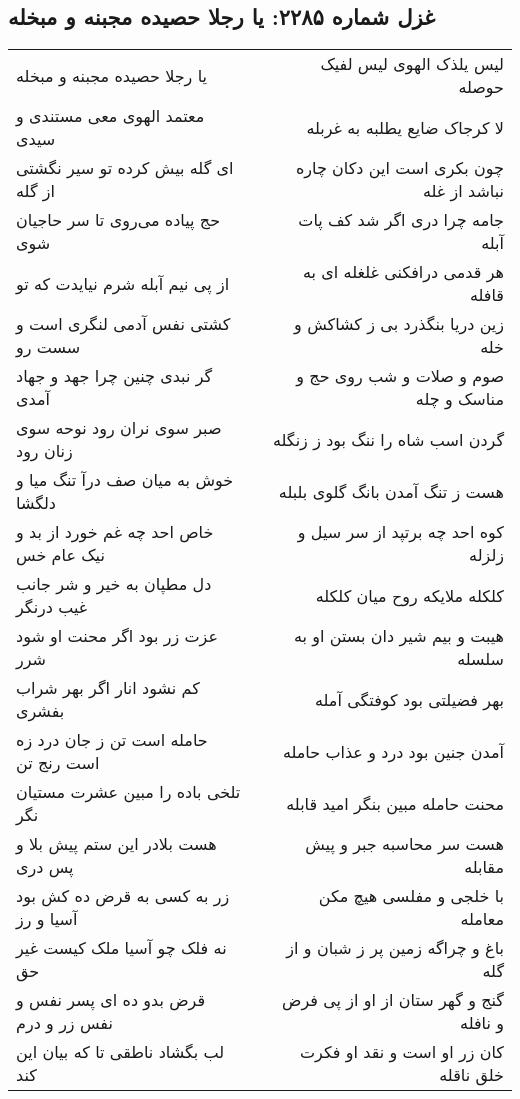\begin{center}
\section*{غزل شماره ۲۲۸۵: یا رجلا حصیده مجبنه و مبخله}
\label{sec:2285}
\begin{longtable}{l p{0.5cm} r}
یا رجلا حصیده مجبنه و مبخله
&&
لیس یلذک الهوی لیس لفیک حوصله
\\
معتمد الهوی معی مستندی و سیدی
&&
لا کرجاک ضایع یطلبه به غربله
\\
ای گله بیش کرده تو سیر نگشتی از گله
&&
چون بکری است این دکان چاره نباشد از غله
\\
حج پیاده می‌روی تا سر حاجیان شوی
&&
جامه چرا دری اگر شد کف پات آبله
\\
از پی نیم آبله شرم نیایدت که تو
&&
هر قدمی درافکنی غلغله ای به قافله
\\
کشتی نفس آدمی لنگری است و سست رو
&&
زین دریا بنگذرد بی ز کشاکش و خله
\\
گر نبدی چنین چرا جهد و جهاد آمدی
&&
صوم و صلات و شب روی حج و مناسک و چله
\\
صبر سوی نران رود نوحه سوی زنان رود
&&
گردن اسب شاه را ننگ بود ز زنگله
\\
خوش به میان صف درآ تنگ میا و دلگشا
&&
هست ز تنگ آمدن بانگ گلوی بلبله
\\
خاص احد چه غم خورد از بد و نیک عام خس
&&
کوه احد چه برتپد از سر سیل و زلزله
\\
دل مطپان به خیر و شر جانب غیب درنگر
&&
کلکله ملایکه روح میان کلکله
\\
عزت زر بود اگر محنت او شود شرر
&&
هیبت و بیم شیر دان بستن او به سلسله
\\
کم نشود انار اگر بهر شراب بفشری
&&
بهر فضیلتی بود کوفتگی آمله
\\
حامله است تن ز جان درد زه است رنج تن
&&
آمدن جنین بود درد و عذاب حامله
\\
تلخی باده را مبین عشرت مستیان نگر
&&
محنت حامله مبین بنگر امید قابله
\\
هست بلادر این ستم پیش بلا و پس دری
&&
هست سر محاسبه جبر و پیش مقابله
\\
زر به کسی به قرض ده کش بود آسیا و رز
&&
با خلجی و مفلسی هیچ مکن معامله
\\
نه فلک چو آسیا ملک کیست غیر حق
&&
باغ و چراگه زمین پر ز شبان و از گله
\\
قرض بدو ده ای پسر نفس و نفس زر و درم
&&
گنج و گهر ستان از او از پی فرض و نافله
\\
لب بگشاد ناطقی تا که بیان این کند
&&
کان زر او است و نقد او فکرت خلق ناقله
\\
\end{longtable}
\end{center}
